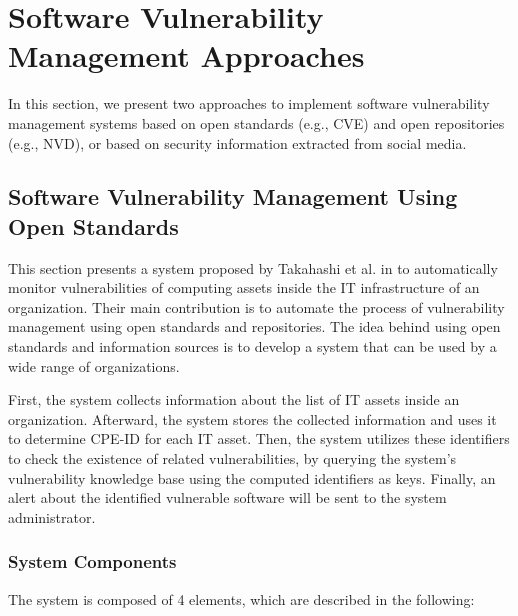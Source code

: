 \documentclass{llncs}
\begin{document}
\section{Software	Vulnerability	Management	Approaches}
 
 In this section, we present two approaches to implement software vulnerability management systems based on  open standards (e.g., CVE) and open repositories (e.g., NVD), or based on  security information extracted from social media.
\subsection{Software	Vulnerability	Management	Using	Open	Standards}

\par This section presents a system proposed by Takahashi et al. in \cite{paper1} to automatically monitor vulnerabilities of computing assets inside the IT infrastructure of an organization. Their main contribution is to automate the process of vulnerability management using open standards and repositories. The idea behind using open standards and information sources is to develop a system that can be used  by a wide range of organizations.
\par
 First, the system collects information about the list of IT assets inside an organization. Afterward, the system stores the collected information and uses it to determine CPE-ID for each IT asset. Then, the system utilizes these identifiers to check the existence of related vulnerabilities, by querying the system's vulnerability knowledge base using the computed identifiers as keys. Finally, an alert about the identified vulnerable software will be sent to the system administrator.
    
\subsubsection {System Components }

\begin{flushleft}
 The system is composed of 4 elements, which are described in the following:
\end{flushleft}
\end{document}
